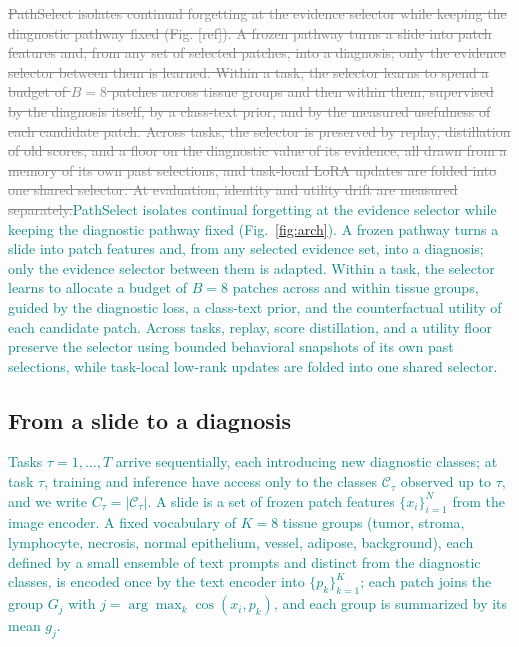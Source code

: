 \documentclass{article}
\newif\ifmarkup \markuptrue
\newcommand{\repc}[3]{\ifmarkup\textcolor{gray}{\sout{#2}}\textcolor{#1}{#3}\else#3\fi}
\newcommand{\repG}[2]{\repc{teal}{#1}{#2}}    %
\newcommand{\Cls}{\mathcal{C}}
\begin{document}
\repG{PathSelect isolates continual forgetting at the evidence selector while keeping the diagnostic pathway fixed (Fig. [ref]). A frozen pathway turns a slide into patch features and, from any set of selected patches, into a diagnosis; only the evidence selector between them is learned. Within a task, the selector learns to spend a budget of $B=8$ patches across tissue groups and then within them, supervised by the diagnosis itself, by a class-text prior, and by the measured usefulness of each candidate patch. Across tasks, the selector is preserved by replay, distillation of old scores, and a floor on the diagnostic value of its evidence, all drawn from a memory of its own past selections, and task-local LoRA updates are folded into one shared selector. At evaluation, identity and utility drift are measured separately.}{PathSelect isolates continual forgetting at the evidence selector while keeping the diagnostic pathway fixed (Fig.~\ref{fig:arch}). A frozen pathway turns a slide into patch features and, from any selected evidence set, into a diagnosis; only the evidence selector between them is adapted. Within a task, the selector learns to allocate a budget of $B=8$ patches across and within tissue groups, guided by the diagnostic loss, a class-text prior, and the counterfactual utility of each candidate patch. Across tasks, replay, score distillation, and a utility floor preserve the selector using bounded behavioral snapshots of its own past selections, while task-local low-rank updates are folded into one shared selector.}

\subsection{From a slide to a diagnosis}
\label{ssec:setup}

\repG{}{Tasks $\tau=1,\ldots,T$ arrive sequentially, each introducing new diagnostic classes; at task $\tau$, training and inference have access only to the classes $\Cls_\tau$ observed up to $\tau$, and we write $C_\tau=|\Cls_\tau|$. A slide is a set of frozen patch features $\{x_i\}_{i=1}^{N}$ from the image encoder. A fixed vocabulary of $K=8$ tissue groups (tumor, stroma, lymphocyte, necrosis, normal epithelium, vessel, adipose, background), each defined by a small ensemble of text prompts and distinct from the diagnostic classes, is encoded once by the text encoder into $\{p_k\}_{k=1}^{K}$; each patch joins the group $G_j$ with $j=\arg\max_k\cos(x_i,p_k)$, and each group is summarized by its mean $g_j$.}
\end{document}
